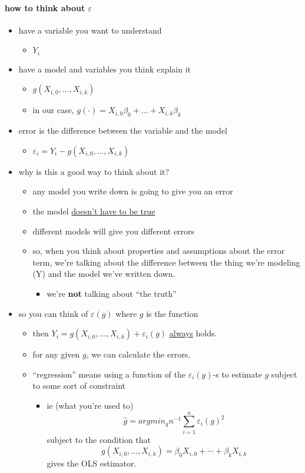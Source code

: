 \paragraph{how to think about $\varepsilon$}
\begin{itemize}
\item have a variable you want to understand
\begin{itemize}
\item $Y_i$
\end{itemize}
\item have a model and variables you think explain it
\begin{itemize}
\item $g(X_{i,0},\dots,X_{i,k})$
\item in our case, $g(\cdot) = X_{i,0}\beta_0 + \dots + X_{i,k}\beta_k$
\end{itemize}
\item error is the difference between the variable and the model
\begin{itemize}
\item $\varepsilon_i = Y_i - g(X_{i,0},\dots,X_{i,k})$
\end{itemize}
\item why is this a good way to think about it?
\begin{itemize}
\item any model you write down is going to give you an error
\item the model \underline{doesn't have to be true}
\item different models will give you different errors
\item so, when you think about properties and assumptions about the
          error term, we're talking about the difference between the
          thing we're modeling (Y) and the model we've written down.
\begin{itemize}
\item we're \textbf{not} talking about ``the truth''
\end{itemize}
\end{itemize}
\item so you can think of $\varepsilon(g)$ where $g$ is the function
\begin{itemize}
\item then $Y_i = g(X_{i,0},\dots,X_{i,k}) + \varepsilon_i(g)$
          \underline{always} holds.
\item for any given $g$, we can calculate the errors.
\item ``regression'' means using a function of the $\varepsilon_i(g)$-s
          to estimate $g$ subject to some sort of constraint
\begin{itemize}
\item ie (what you're used to)
            \[\hat g = argmin_g n^{-1} \sum_{i=1}^n \varepsilon_i(g)^2\]
            subject to the condition that
            \[g(X_{i,0}, \dots, X_{i,k}) = \beta_0 X_{i,0}+ \cdots +
            \beta_k X_{i,k}\]
            gives the OLS estimator.
\end{itemize}
\end{itemize}
\end{itemize}

